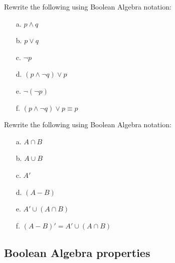 \documentclass[a4paper,12pt]{book}
\newcounter{question}
\begin{document}
		\newpage

        \begin{questionNOGRADE}{\thequestion}

			Rewrite the following using Boolean Algebra notation:

			\begin{enumerate}
				\item[a.] 	$p \land q$							
				\item[b.] 	$p \lor q$								
				\item[c.] 	$\neg p$								
				\item[d.]	$(p \land \neg q) \lor p$			
				\item[e.]	$\neg(\neg p)$						
				\item[f.]	$(p \land \neg q) \lor p \equiv p$	
			\end{enumerate}

        \end{questionNOGRADE}

		\hrulefill

        \begin{questionNOGRADE}{\thequestion}

			Rewrite the following using Boolean Algebra notation:

			\begin{enumerate}
				\item[a.] 	$A \cap B$								
				\item[b.] 	$A \cup B$								
				\item[c.] 	$A'$									
				\item[d.]	$(A-B)$									
				\item[e.]	$A' \cup (A \cap B)$					
				\item[f.]	$(A - B)' = A' \cup (A \cap B)$		
			\end{enumerate}

        \end{questionNOGRADE}

    \newpage
    \subsection{Boolean Algebra properties}
\end{document}
